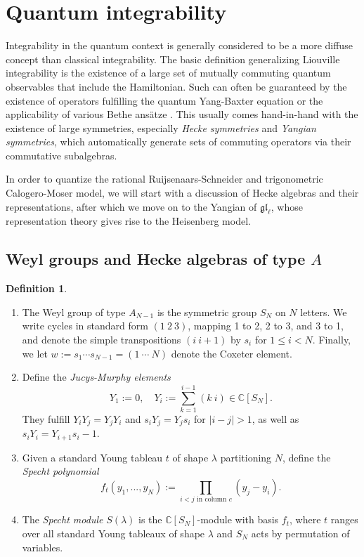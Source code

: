 \documentclass[11pt]{report}
\theoremstyle{definition}
\newtheorem{definition}[theorem]{Definition}
\theoremstyle{remark}
\theoremstyle{remark}
\newcommand{\C}{\mathbb{C}}
\begin{document}
\section{Quantum integrability}

Integrability in the quantum context is generally considered to be a more diffuse concept than classical integrability. The basic definition generalizing Liouville integrability is the existence of a large set of mutually commuting quantum observables that include the Hamiltonian. Such can often be guaranteed by the existence of operators fulfilling the quantum Yang-Baxter equation or the applicability of various Bethe ansätze \cite{book:arutyunov:betheAnsatz}. This usually comes hand-in-hand with the existence of large symmetries, especially \emph{Hecke symmetries} and \emph{Yangian symmetries}, which automatically generate sets of commuting operators via their commutative subalgebras.

In order to quantize the rational Ruijsenaars-Schneider and trigonometric Calogero-Moser model, we will start with a discussion of Hecke algebras and their representations, after which we move on to the Yangian of $\mathfrak{gl}_\ell$, whose representation theory gives rise to the Heisenberg model.

\subsection{Weyl groups and Hecke algebras of type $A$}

\begin{definition}
\begin{enumerate}[label=(\roman*)]
\item The Weyl group of type $A_{N-1}$ is the symmetric group $S_N$ on $N$ letters. We write cycles in standard form $(1 \ 2 \ 3)$, mapping 1 to 2, 2 to 3, and 3 to 1, and denote the simple transpositions $(i \ i+1)$ by $s_i$ for $1 \leq i < N$. Finally, we let $w := s_1 \cdots s_{N-1} = (1 \ \cdots \ N)$ denote the Coxeter element.
\item Define the \emph{Jucys-Murphy elements}
\begin{equation*}
Y_1 := 0, \quad Y_i := \sum_{k=1}^{i-1} (k \ i) \in \C[S_N].
\end{equation*}
They fulfill $Y_i Y_j = Y_j Y_i$ and $s_i Y_j = Y_j s_i$ for $|i-j|>1$, as well as $s_i Y_i = Y_{i+1} s_i-1$.
\item Given a standard Young tableau $t$ of shape $\lambda$ partitioning $N$, define the \emph{Specht polynomial}
\begin{equation*}
f_t(y_1,...,y_N) := \prod_{i<j \text{ in column } c} (y_j-y_i).
\end{equation*}
\item The \emph{Specht module} $S(\lambda)$ is the $\C[S_N]$-module with basis $f_t$, where $t$ ranges over all standard Young tableaux of shape $\lambda$ and $S_N$ acts by permutation of variables.
\end{enumerate}
\end{definition}
\end{document}
